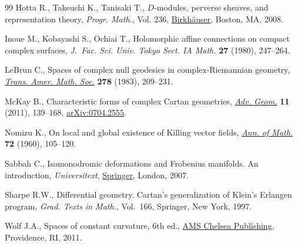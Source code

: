 \documentclass[pdftex]{sigma}
\numberwithin{equation}{section}
\begin{document}
\begin{thebibliography}{99}
Hotta R., Takeuchi K., Tanisaki T., {$D$}-modules, perverse sheaves, and
 representation theory, \textit{Progr. Math.}, Vol. 236, \href{https://doi.org/10.1007/978-0-8176-4523-6}{Birkh\"auser}, Boston,
 MA, 2008.

Inoue M., Kobayashi S., Ochiai T., Holomorphic affine connections on compact
 complex surfaces, \textit{J.~Fac. Sci. Univ. Tokyo Sect. IA Math.}
 \textbf{27} (1980), 247--264.

LeBrun C., Spaces of complex null geodesics in complex-{R}iemannian geometry,
 \href{https://doi.org/10.2307/1999312}{\textit{Trans. Amer. Math. Soc.}} \textbf{278} (1983), 209--231.

McKay B., Characteristic forms of complex {C}artan geometries, \href{https://doi.org/10.1515/ADVGEOM.2010.044}{\textit{Adv.
 Geom.}} \textbf{11} (2011), 139--168, \href{https://arxiv.org/abs/0704.2555}{arXiv:0704.2555}.

Nomizu K., On local and global existence of {K}illing vector fields,
\href{https://doi.org/10.2307/1970148}{\textit{Ann. of Math.}} \textbf{72} (1960), 105--120.

Sabbah C., Isomonodromic deformations and {F}robenius manifolds. An
 introduction, \textit{Universitext}, \href{https://doi.org/10.1007/978-1-84800-054-4}{Springer}, London, 2007.

Sharpe R.W., Differential geometry. Cartan's generalization of Klein's Erlangen
 program, \textit{Grad. Texts in Math.}, Vol.~166, Springer, New York, 1997.

Wolf J.A., Spaces of constant curvature, 6th ed., \href{https://doi.org/10.1090/chel/372}{AMS Chelsea Publishing},
 Providence, RI, 2011.

\end{thebibliography}\LastPageEnding
\end{document}
